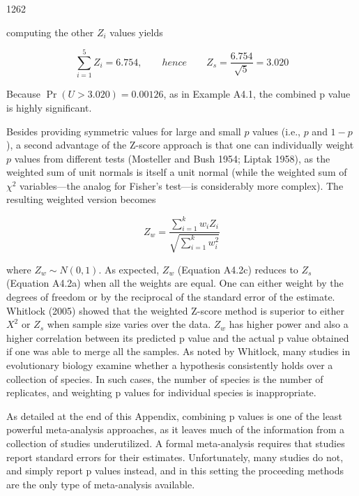 \documentclass{article}
\begin{document}
1262

computing the other  $ Z_{i} $ values yields

\begin{equation}
\sum_{i=1}^{5}Z_{i}=6.754,\qquad hence\qquad Z_{s}=\frac{6.754}{\sqrt{5}}=3.020
\end{equation}

Because  $ \Pr(U > 3.020) = 0.00126 $, as in Example A4.1, the combined p value is highly significant.

Besides providing symmetric values for large and small $p$ values (i.e., $p$ and $1-p$), a second advantage of the Z-score approach is that one can individually weight $p$ values from different tests (Mosteller and Bush 1954; Liptak 1958), as the weighted sum of unit normals is itself a unit normal (while the weighted sum of $\chi^2$ variables—the analog for Fisher's test—is considerably more complex). The resulting weighted version becomes

\begin{equation}
Z_{w}=\frac{\sum_{i=1}^{k}w_{i}Z_{i}}{\sqrt{\sum_{i=1}^{k}w_{i}^{2}}}
\end{equation}

where  $ Z_w \sim N(0,1) $. As expected,  $ Z_w $ (Equation A4.2c) reduces to  $ Z_s $ (Equation A4.2a) when all the weights are equal. One can either weight by the degrees of freedom or by the reciprocal of the standard error of the estimate. Whitlock (2005) showed that the weighted Z-score method is superior to either  $ X^2 $ or  $ Z_s $ when sample size varies over the data.  $ Z_w $ has higher power and also a higher correlation between its predicted p value and the actual p value obtained if one was able to merge all the samples. As noted by Whitlock, many studies in evolutionary biology examine whether a hypothesis consistently holds over a collection of species. In such cases, the number of species is the number of replicates, and weighting p values for individual species is inappropriate.

As detailed at the end of this Appendix, combining p values is one of the least powerful meta-analysis approaches, as it leaves much of the information from a collection of studies underutilized. A formal meta-analysis requires that studies report standard errors for their estimates. Unfortunately, many studies do not, and simply report p values instead, and in this setting the proceeding methods are the only type of meta-analysis available.
\end{document}
